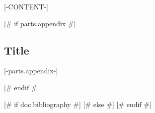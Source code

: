 \documentclass[qe,nameyear,draft]{econsocart}
[# else #]
\begin{document}
[-CONTENT-]

[# if parts.appendix #]
\begin{appendix}
\section*{Title}\label{appn} %
[-parts.appendix-]
\end{appendix}
[# endif #]

[# if doc.bibliography #]
[# else #]
[# endif #]
\end{document}
